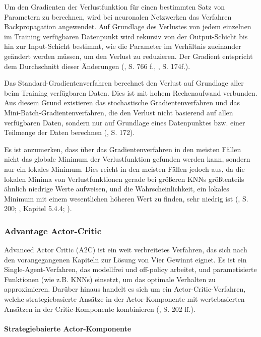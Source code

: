 Um den Gradienten der Verlustfunktion für einen bestimmten Satz von Parametern zu berechnen, wird bei neuronalen Netzwerken das Verfahren Backpropagation angewendet. Auf Grundlage des Verlustes von jedem einzelnen im Training verfügbaren Datenpunkt wird rekursiv von der Output-Schicht bis hin zur Input-Schicht bestimmt, wie die Parameter im Verhältnis zueinander geändert werden müssen, um den Verlust zu reduzieren. Der Gradient entspricht dem Durchschnitt dieser Änderungen (\cite{Russell.2020}, S. 766 f., \cite{Albrecht.2024}, S. 174f.).

Das Standard-Gradientenverfahren berechnet den Verlust auf Grundlage aller beim Training verfügbaren Daten. Dies ist mit hohem Rechenaufwand verbunden. Aus diesem Grund existieren das stochastische Gradientenverfahren und das Mini-Batch-Gradientenverfahren, die den Verlust nicht basierend auf allen verfügbaren Daten, sondern nur auf Grundlage eines Datenpunktes bzw. einer Teilmenge der Daten berechnen (\cite{Albrecht.2024}, S. 172).

Es ist anzumerken, dass über das Gradientenverfahren in den meisten Fällen nicht das globale Minimum der Verlustfunktion gefunden werden kann, sondern nur ein lokales Minimum. Dies reicht in den meisten Fällen jedoch aus, da die lokalen Minima von Verlustfunktionen gerade bei größeren KNNs größtenteils ähnlich niedrige Werte aufweisen, und die Wahrscheinlichkeit, ein lokales Minimum mit einem wesentlichen höheren Wert zu finden, sehr niedrig ist (\cite{Sutton.2018}, S. 200; \cite{Ferguson.January2019}, Kapitel 5.4.4; \cite{Choromanska.2015}).

\subsubsection{Advantage Actor-Critic}

Advanced Actor Critic (A2C) ist ein weit verbreitetes Verfahren, das sich nach den vorangegangenen Kapiteln zur Lösung von Vier Gewinnt eignet. Es ist ein Single-Agent-Verfahren, das modellfrei und off-policy arbeitet, und parametisierte Funktionen (wie z.B. KNNs) einsetzt, um das optimale Verhalten zu approximieren. Darüber hinaus handelt es sich um ein Actor-Critic-Verfahren, welche strategiebasierte Ansätze in der Actor-Komponente mit wertebasierten Ansätzen in der Critic-Komponente kombinieren (\cite{Albrecht.2024}, S. 202 ff.).

\paragraph{Strategiebaierte Actor-Komponente}

